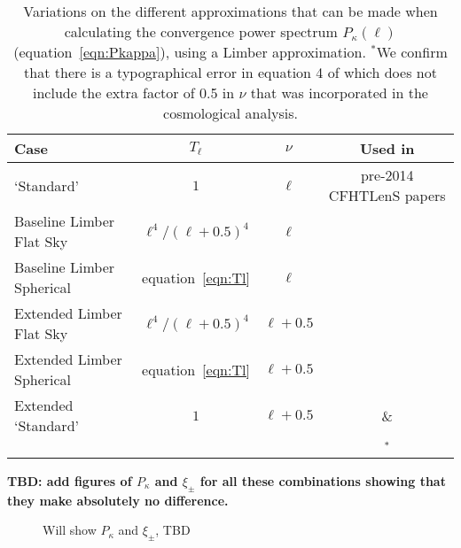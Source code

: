  \begin{table}[htb]
\label{tab:Tl_nu}
\begin{center}
\begin{tabular}{ | l | c | c  | c |}
\hline
Case & $T_\ell$ & $\nu$ & Used in \\ \hline
\citet{kitching/etal:2016} `Standard' & $1$ & $\ell$ & pre-2014 CFHTLenS papers \\
Baseline Limber Flat Sky &  $\ell^4 / (\ell + 0.5)^4$ & $\ell$ & \\
Baseline Limber Spherical & equation~\ref{eqn:Tl} & $\ell$ & \\
Extended Limber Flat Sky & $\ell^4 / (\ell + 0.5)^4$ & $\ell + 0.5$ & \\
Extended Limber Spherical & equation~\ref{eqn:Tl}& $\ell + 0.5$  & \\
Extended `Standard' & $1$ & $\ell + 0.5$ & \citet{joudaki/etal:2016} \&  \\
  & & & \citet{hildebrandt/etal:2016}$^*$\\\hline
 \end{tabular}
 \end{center}
 \caption{Variations on the different approximations that can be made when calculating the convergence power spectrum $P_\kappa(\ell)$ (equation~\ref{eqn:Pkappa}), using a Limber approximation.  $^*$We confirm that there is a typographical error in equation 4 of \citet{hildebrandt/etal:2016} which does not include the extra factor of 0.5 in $\nu$ that was incorporated in the cosmological analysis.}  
 \end{table}

{\bf TBD: add figures of $P_\kappa$ and $\xi_\pm$ for all these combinations showing that they make absolutely no difference.}
 
 \begin{figure}
 \label{fig:Cl_xi}
 \caption{Will show $P_\kappa$ and $\xi_\pm$, TBD}
 \end{figure}
 
